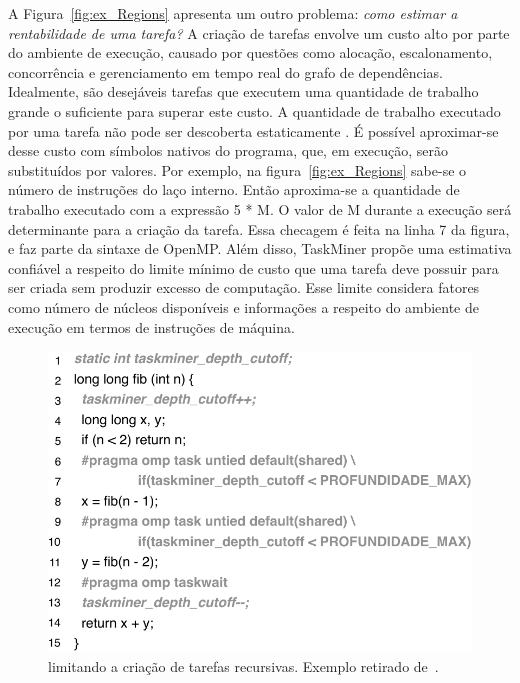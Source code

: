 \documentclass[sigplan,10pt,review]{acmart}
\newcommand\Taskminer{\mbox{\textsf{TaskMiner}}}
\begin{document}
A Figura~\ref{fig:ex_Regions} apresenta um outro problema: {\em como estimar a rentabilidade de uma tarefa?}
A criação de tarefas envolve um custo alto por parte do ambiente de execução, causado por questões como
alocação, escalonamento, concorrência e gerenciamento em tempo real do grafo de dependências.
Idealmente, são desejáveis tarefas que executem uma quantidade de trabalho
grande o suficiente para superar este custo. A quantidade de trabalho executado
por uma tarefa não pode ser descoberta estaticamente \cite{Rice53}. 
É possível aproximar-se desse custo com
símbolos nativos do programa, que, em execução, serão substituídos por valores. 
Por exemplo, na figura~\ref{fig:ex_Regions}
sabe-se o número de instruções do laço interno. Então aproxima-se a quantidade de trabalho executado
com a expressão \textsf{5 * M}. O valor de \textsf{M} durante a execução será determinante para
a criação da tarefa. Essa checagem é feita na linha 7 da figura, 
e faz parte da sintaxe de OpenMP. Além disso, {\Taskminer} propõe
uma estimativa confiável a respeito do limite mínimo de custo 
que uma tarefa deve possuir para ser criada sem produzir
excesso de computação. Esse limite considera fatores como número de 
núcleos disponíveis e informações a respeito do ambiente
de execução em termos de instruções de máquina.
	
\begin{figure}[h!]
\begin{center}
\includegraphics[width=1\columnwidth]{images/ex_cutoff}
\caption{limitando a criação de tarefas recursivas.
Exemplo retirado de~\cite[Fig.1]{Iwasaki16}.}
\label{fig:ex_cutoff}
\end{center}
\end{figure}
	
\end{document}

